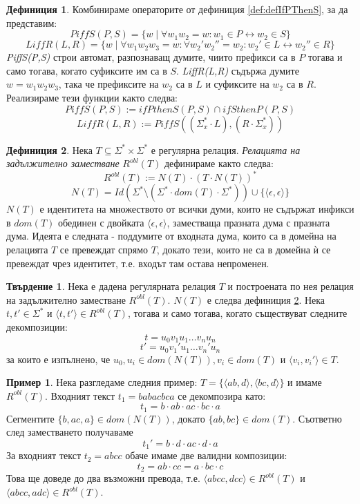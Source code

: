 \documentclass[12pt, oneside]{article}
\theoremstyle{definition}
\newtheorem{definition}{Дефиниция}[section]
\newtheorem{example}{Пример}[section]
\newtheorem{proposition}{Твърдение}[section]
\begin{document}
\begin{definition}
	Комбинираме операторите от дефиниция \ref{def:defIfPThenS}, за да представим:
	\[ PiffS(P,S) = \{ w \mid \forall w_1w_2 = w: w_1 \in P \leftrightarrow w_2 \in S \} \]
	\[ LiffR(L,R) = \{ w \mid \forall w_1w_2w_3 = w: \forall w_2'w_2'' = w_2: w_2' \in L \leftrightarrow w_2'' \in R \} \]
	\emph{PiffS(P,S)} строи автомат, разпознаващ думите, чиито префикси са в \(P\) тогава и само тогава, когато суфиксите им са в \(S\). \emph{LiffR(L,R)} съдържа думите \( w = w_1w_2w_3 \), така че префиксите на \(w_2\) са в \(L\) и суфиксите на \(w_2\) са в \(R\). Реализираме тези функции както следва:
	\[ PiffS(P,S) := ifPthenS(P,S) \cap ifSthenP(P,S) \]
	\[ LiffR(L,R) := PiffS((\Sigma_x^* \cdot L), (R \cdot \Sigma_x^*)) \]	
\end{definition}

\begin{definition}\label{def:Robl}
	Нека \(T \subseteq \Sigma^* \times \Sigma^* \) е регулярна релация. \emph{Релацията на задължително заместване} \(R^{obl}(T)\) дефинираме както следва:
	\[ R^{obl}(T) := N(T) \cdot (T \cdot N(T))^* \]
	\[ N(T) = Id(\Sigma^* \setminus (\Sigma^* \cdot dom(T) \cdot \Sigma^*)) \cup \{ \langle \epsilon, \epsilon \rangle \} \]
	\(N(T)\) е идентитета на множеството от всички думи, които не съдържат инфикси в \(dom(T)\) обединен с двойката \(\langle \epsilon, \epsilon \rangle\), заместваща празната дума с празната дума.
	Идеята е следната - поддумите от входната дума, които са в домейна на релацията \(T\) се превеждат спрямо \(T\), докато тези, които не са в домейна ѝ се превеждат чрез идентитет, т.е. входът там остава непроменен.
\end{definition}

\begin{proposition}
	Нека е дадена регулярната релация \(T\) и построената по нея релация на задължително заместване \(R^{obl}(T)\). \(N(T)\) е следва дефиниция \ref{def:Robl}. Нека \(t, t' \in \Sigma^*\) и \( \langle t, t' \rangle \in R^{obl}(T) \), тогава и само тогава, когато съществуват следните декомпозиции:
	\[ t = u_0 v_1 u_1 \dots v_n u_n \]
	\[ t' = u_0 v_1' u_1 \dots v_n' u_n \]
	за които е изпълнено, че \( u_0, u_i \in dom(N(T)), v_i \in dom(T) \) и \( \langle v_i, v_i' \rangle \in T \).
\end{proposition}

\begin{example}
	Нека разгледаме следния пример: \(T = \{ \langle ab, d \rangle, \langle bc, d \rangle \} \) и имаме \(R^{obl}(T) \). Входният текст \( t_1 = babacbca \) се декомпозира като:
	\[ t_1 = b \cdot ab \cdot ac \cdot bc \cdot a \]
	Сегментите \(\{b, ac, a\} \in dom(N(T))\), докато \(\{ab, bc\} \in dom(T)\). Съответно след заместването получаваме
	\[ t_1' = b \cdot d \cdot ac \cdot d \cdot a \]
	За входният текст \( t_2 = abcc \) обаче имаме две валидни композиции:
	\[ t_2 = ab \cdot cc = a \cdot bc \cdot c \]
	Това ще доведе до два възможни превода, т.е. \( \langle abcc, dcc \rangle \in R^{obl}(T) \) и \( \langle abcc, adc \rangle \in R^{obl}(T) \).
\end{example}
\end{document}
